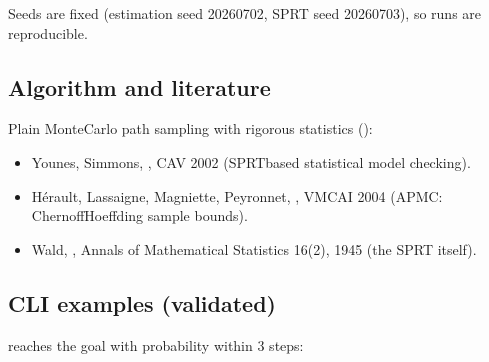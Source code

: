 \documentclass[a4paper,10pt,english]{sphinxmanual}
\begin{document}
\sphinxAtStartPar
Seeds are fixed (estimation seed 20260702, SPRT seed 20260703), so runs are
reproducible.


\subsection{Algorithm and literature}
\label{\detokenize{manual/smc:algorithm-and-literature}}
\sphinxAtStartPar
Plain Monte\sphinxhyphen{}Carlo path sampling with rigorous statistics ():
\begin{itemize}
\item {} 
\sphinxAtStartPar
Younes, Simmons, , CAV 2002 (SPRT\sphinxhyphen{}based statistical model checking).

\item {} 
\sphinxAtStartPar
Hérault, Lassaigne, Magniette, Peyronnet, , VMCAI 2004 (APMC: Chernoff\sphinxhyphen{}Hoeffding sample bounds).

\item {} 
\sphinxAtStartPar
Wald, , Annals of Mathematical
Statistics 16(2), 1945 (the SPRT itself).

\end{itemize}


\subsection{CLI examples (validated)}
\label{\detokenize{manual/smc:cli-examples-validated}}
\sphinxAtStartPar
{} reaches the goal with probability  within 3 steps:
\end{document}

